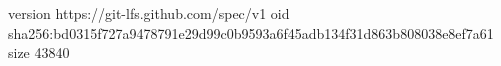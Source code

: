 version https://git-lfs.github.com/spec/v1
oid sha256:bd0315f727a9478791e29d99c0b9593a6f45adb134f31d863b808038e8ef7a61
size 43840
